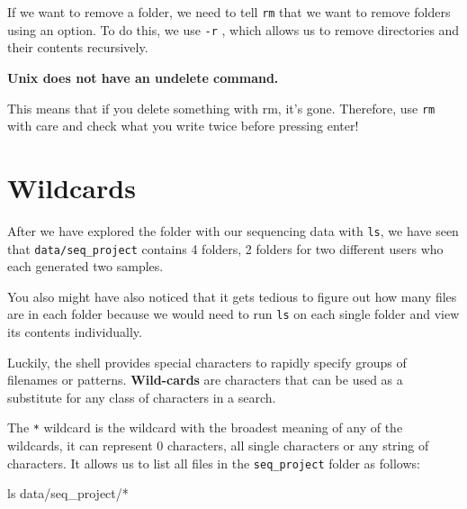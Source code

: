 \documentclass[
  letterpaper,
  DIV=11,
  numbers=noendperiod]{scrreprt}
\newenvironment{Shaded}{}{}
\newcommand{\FunctionTok}[1]{\textcolor[rgb]{0.44,0.26,0.76}{#1}}
\newcommand{\NormalTok}[1]{\textcolor[rgb]{0.14,0.16,0.18}{#1}}
\newcommand{\PreprocessorTok}[1]{\textcolor[rgb]{0.84,0.23,0.29}{#1}}
\begin{document}
If we want to remove a folder, we need to tell \texttt{rm} that we want
to remove folders using an option. To do this, we use \texttt{-r} ,
which allows us to remove directories and their contents recursively.

\begin{tcolorbox}[enhanced jigsaw, breakable, left=2mm, title=\textcolor{quarto-callout-important-color}{\faExclamation}\hspace{0.5em}{Important}, opacityback=0, opacitybacktitle=0.6, rightrule=.15mm, bottomrule=.15mm, colback=white, colframe=quarto-callout-important-color-frame, coltitle=black, bottomtitle=1mm, arc=.35mm, toprule=.15mm, colbacktitle=quarto-callout-important-color!10!white, toptitle=1mm, titlerule=0mm, leftrule=.75mm]

\textbf{Unix does not have an undelete command.}

This means that if you delete something with rm, it's gone. Therefore,
use \texttt{rm} with care and check what you write twice before pressing
enter!

\end{tcolorbox}

\section{Wildcards}\label{wildcards}

After we have explored the folder with our sequencing data with
\texttt{ls}, we have seen that \texttt{data/seq\_project} contains 4
folders, 2 folders for two different users who each generated two
samples.

You also might have also noticed that it gets tedious to figure out how
many files are in each folder because we would need to run \texttt{ls}
on each single folder and view its contents individually.

Luckily, the shell provides special characters to rapidly specify groups
of filenames or patterns. \textbf{Wild-cards} are characters that can be
used as a substitute for any class of characters in a search.

The \texttt{*} wildcard is the wildcard with the broadest meaning of any
of the wildcards, it can represent 0 characters, all single characters
or any string of characters. It allows us to list all files in the
\texttt{seq\_project} folder as follows:

\begin{Shaded}
\begin{Highlighting}[]
\FunctionTok{ls}\NormalTok{ data/seq\_project/}\PreprocessorTok{*}
\end{Highlighting}
\end{Shaded}
\end{document}
